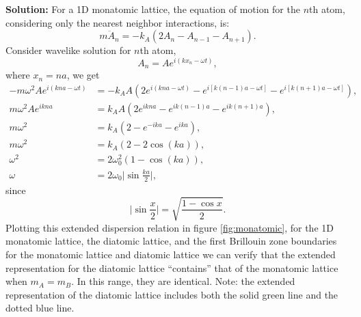 \documentclass[12pt]{article}
\begin{document}
\textbf{Solution:}
For a 1D monatomic lattice, the equation of motion for the $n$th atom,
considering only the nearest neighbor interactions, is:
\begin{equation}
	m \ddot{A}_n = -k_A (2A_n - A_{n-1} - A_{n+1}).
\end{equation}
Consider wavelike solution for $n$th atom,
\begin{equation}
	A_{n} = A e^{i (k x_n - \omega t)},
\end{equation}
where $x_n = n a$, we get
\begin{align}
	-m \omega^2 A e^{i (k n a - \omega t)} & = -k_A A(2 e^{i (k n a - \omega t)} - e^{i [k (n-1)a - \omega t]} - e^{i [k (n+1)a - \omega t]}), \\
	m \omega^2 A e^{i k n a}               & = k_A A(2 e^{i k n a} - e^{i k (n-1)a} - e^{i k (n+1)a}),                                         \\
	m \omega^2                             & = k_A (2 - e^{-i k a} - e^{i k a}),                                                               \\
	m \omega^2                             & = k_A (2 - 2 \cos(k a)),                                                                          \\
	\omega^2                               & = 2 \omega_0^2 (1 - \cos(k a)),                                                                   \\
	\omega                                 & = 2 \omega_0 \bigg| \sin \frac{k a}{2} \bigg|,
\end{align}
since
\begin{equation}
	\bigg| \sin \frac{x}{2} \bigg| = \sqrt{\frac{1 - \cos x}{2}}.
\end{equation}
Plotting this extended dispersion relation in figure \ref{fig:monatomic}, for the 1D monatomic lattice, the diatomic lattice, and the first
Brillouin zone boundaries for the monatomic lattice and diatomic lattice we can verify that the extended
representation for the diatomic lattice ``contains” that of the monatomic lattice when
$m_A = m_B$. In this range, they are identical.
Note: the extended representation of the diatomic lattice includes both the solid green line and
the dotted blue line.
\end{document}
